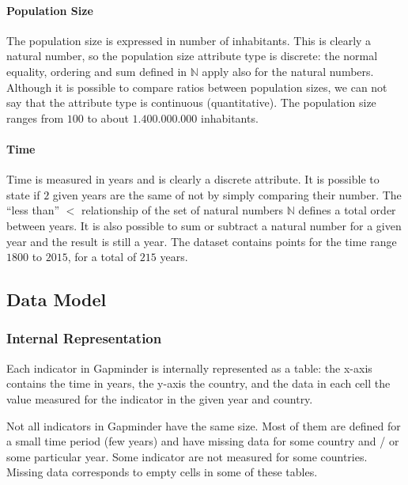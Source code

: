 \paragraph{Population Size}
The population size is expressed in number of inhabitants.
This is clearly a natural number, so the population size attribute type is discrete:
the normal equality, ordering and sum defined in $\mathbb{N}$ apply also for the natural numbers.
Although it is possible to compare ratios between population sizes, we can not say that the attribute type is continuous (quantitative). 
The population size ranges from $100$ to about $1.400.000.000$ inhabitants.

\paragraph{Time}
Time is measured in years and is clearly a discrete attribute.
It is possible to state if $2$ given years are the same of not by simply comparing their number.
The ``less than'' $<$ relationship of the set of natural numbers $\mathbb{N}$ defines a total order between years.
It is also possible to sum or subtract a natural number for a given year and the result is still a year.
The dataset contains points for the time range $1800$ to $2015$, for a total of $215$ years.


\subsection{Data Model}

\subsubsection{Internal Representation}
\label{subsubsec:internal_representation}
Each indicator in Gapminder is internally represented as a table:
the x-axis contains the time in years, the y-axis the country, and the data in each cell the value measured for the indicator in the given year and country.

Not all indicators in Gapminder have the same size.
Most of them are defined for a small time period (few years) and have missing data for some country and / or some particular year.
Some indicator are not measured for some countries.
Missing data corresponds to empty cells in some of these tables.

